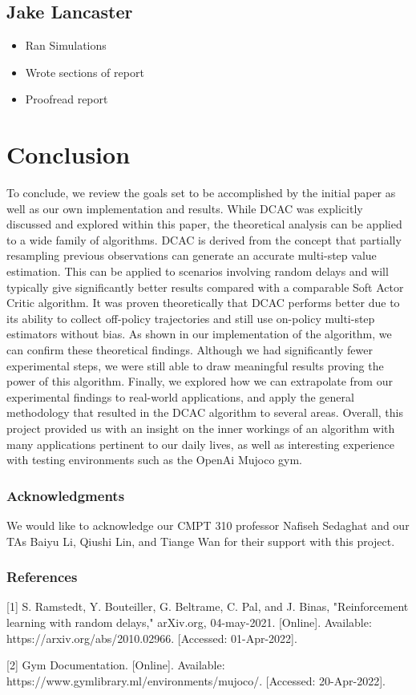 \documentclass{article} %
\begin{document}
\begin{multicols}{2}
\subsection{Jake Lancaster}
\begin{itemize}[itemsep=-2pt,topsep=-5pt, leftmargin=10pt]
\item Ran Simulations
\item Wrote sections of report
\item Proofread report
\end{itemize} 

\end{multicols}

\section{Conclusion}

To conclude, we review the goals set to be accomplished by the initial paper as well as our own implementation and results. While DCAC was explicitly discussed and explored within this paper, the theoretical analysis can be applied to a wide family of algorithms. DCAC is derived from the concept that partially resampling previous observations can generate an accurate multi-step value estimation. This can be applied to scenarios involving random delays and will typically give significantly better results compared with a comparable Soft Actor Critic algorithm. It was proven theoretically that DCAC performs better due to its ability to collect off-policy trajectories and still use on-policy multi-step estimators without bias. As shown in our implementation of the algorithm, we can confirm these theoretical findings. Although we had significantly fewer experimental steps, we were still able to draw meaningful results proving the power of this algorithm. Finally, we explored how we can extrapolate from our experimental findings to real-world applications, and apply the general methodology that resulted in the DCAC algorithm to several areas. Overall, this project provided us with an insight on the inner workings of an algorithm with many applications pertinent to our daily lives, as well as interesting experience with testing environments such as the OpenAi Mujoco gym.


\subsubsection*{Acknowledgments}
We would like to acknowledge our CMPT 310 professor Nafiseh Sedaghat and our TAs 
Baiyu Li, Qiushi Lin, and Tiange Wan for their support with this project.

\subsubsection*{References}
\small{
[1] S. Ramstedt, Y. Bouteiller, G. Beltrame, C. Pal, and J. Binas, 
      "Reinforcement learning with random delays," arXiv.org, 04-may-2021. [Online]. 
      Available: https://arxiv.org/abs/2010.02966. [Accessed: 01-Apr-2022].

[2] Gym Documentation. [Online]. Available: https://www.gymlibrary.ml/environments/mujoco/. [Accessed: 20-Apr-2022]. 
}
\end{document}

